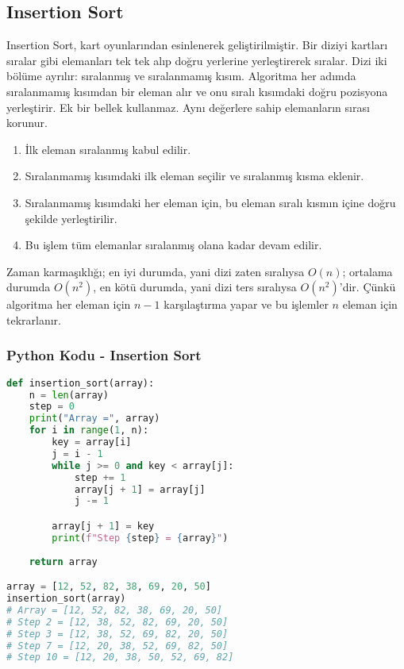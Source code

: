 \newpage

\subsection{Insertion Sort}

Insertion Sort, kart oyunlarından esinlenerek geliştirilmiştir. Bir diziyi kartları sıralar gibi elemanları tek tek alıp doğru yerlerine yerleştirerek sıralar. Dizi iki bölüme ayrılır: sıralanmış ve sıralanmamış kısım. Algoritma her adımda sıralanmamış kısımdan bir eleman alır ve onu sıralı kısımdaki doğru pozisyona yerleştirir. Ek bir bellek kullanmaz. Aynı değerlere sahip elemanların sırası korunur.

\begin{enumerate}
    \item İlk eleman sıralanmış kabul edilir.
    \item Sıralanmamış kısımdaki ilk eleman seçilir ve sıralanmış kısma eklenir.
    \item Sıralanmamış kısımdaki her eleman için, bu eleman sıralı kısmın içine doğru şekilde yerleştirilir.
    \item Bu işlem tüm elemanlar sıralanmış olana kadar devam edilir.
\end{enumerate}

Zaman karmaşıklığı; en iyi durumda, yani dizi zaten sıralıysa $O(n)$; ortalama durumda $O(n^2)$, en kötü durumda, yani dizi ters sıralıysa $O(n^2)$'dir. Çünkü algoritma her eleman için $n-1$ karşılaştırma yapar ve bu işlemler $n$ eleman için tekrarlanır.

\subsubsection{Python Kodu - Insertion Sort}

\begin{lstlisting}[language=Python]
def insertion_sort(array):
    n = len(array)
    step = 0
    print("Array =", array)
    for i in range(1, n):
        key = array[i]
        j = i - 1
        while j >= 0 and key < array[j]:
            step += 1
            array[j + 1] = array[j]
            j -= 1

        array[j + 1] = key
        print(f"Step {step} = {array}")
    
    return array

array = [12, 52, 82, 38, 69, 20, 50]
insertion_sort(array)
# Array = [12, 52, 82, 38, 69, 20, 50]
# Step 2 = [12, 38, 52, 82, 69, 20, 50]
# Step 3 = [12, 38, 52, 69, 82, 20, 50]
# Step 7 = [12, 20, 38, 52, 69, 82, 50]
# Step 10 = [12, 20, 38, 50, 52, 69, 82]
\end{lstlisting}

